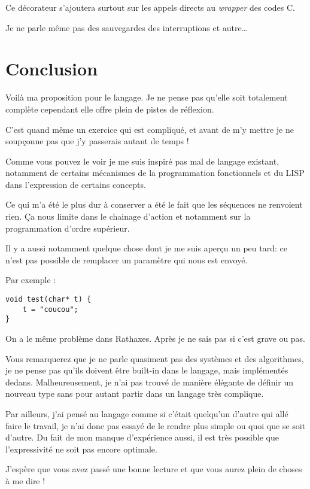 \documentclass{rtxreport}
\begin{document}
Ce décorateur s’ajoutera surtout sur les appels directs au \emph{wrapper} des codes C.

Je ne parle même pas des sauvegardes des interruptions et autre\ldots


\chapter{Conclusion}
Voilà ma proposition pour le langage. Je ne pense pas qu’elle soit totalement complète cependant elle offre plein de pistes de réflexion.

C’est quand même un exercice qui est compliqué, et avant de m’y mettre je ne soupçonne pas que j’y passerais autant de temps !

Comme vous pouvez le voir je me suis inspiré pas mal de langage existant, notamment de certains mécanismes de la programmation fonctionnels et du LISP dans l’expression de certains concepts.

Ce qui m’a été le plus dur à conserver a été le fait que les séquences ne renvoient rien. Ça nous limite dans le chainage d’action et notamment sur la programmation d’ordre supérieur.

Il y a aussi notamment quelque chose dont je me suis aperçu un peu tard: ce n’est pas possible de remplacer un paramètre qui nous est envoyé.

Par exemple :
\lstset{language=C}
\begin{lstlisting}
void test(char* t) {
	t = "coucou";
}
\end{lstlisting}


On a le même problème dans Rathaxes. Après je ne sais pas si c’est grave ou pas.

Vous remarquerez que je ne parle quasiment pas des systèmes et des algorithmes, je ne pense pas qu’ils doivent être built-in dans le langage, mais implémentés dedans. Malheureusement, je n’ai pas trouvé de manière élégante de définir un nouveau type sans pour autant partir dans un langage très complique.

Par ailleurs, j’ai pensé au langage comme si c’était quelqu’un d’autre qui allé faire le travail, je n’ai donc pas essayé de le rendre plus simple ou quoi que se soit d’autre. Du fait de mon manque d’expérience aussi, il est très possible que l’expressivité ne soit pas encore optimale.

J’espère que vous avez passé une bonne lecture et que vous aurez plein de choses à me dire !
\end{document}
